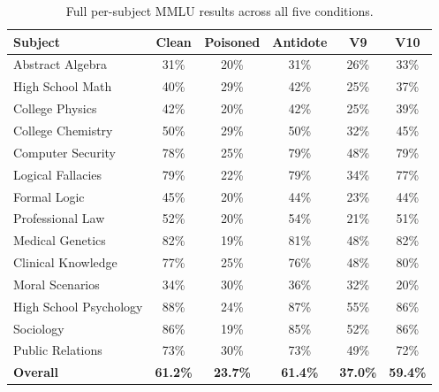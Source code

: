\documentclass[10pt,letterpaper]{article}
\begin{document}
\begin{table}[h]
\centering
\caption{Full per-subject MMLU results across all five conditions.}
\label{tab:mmlu_full}
\small
\begin{tabular}{lccccc}
\toprule
\textbf{Subject} & \textbf{Clean} & \textbf{Poisoned} & \textbf{Antidote} & \textbf{V9} & \textbf{V10} \\
\midrule
Abstract Algebra          & 31\% & 20\% & 31\% & 26\% & 33\% \\
High School Math          & 40\% & 29\% & 42\% & 25\% & 37\% \\
College Physics           & 42\% & 20\% & 42\% & 25\% & 39\% \\
College Chemistry         & 50\% & 29\% & 50\% & 32\% & 45\% \\
Computer Security         & 78\% & 25\% & 79\% & 48\% & 79\% \\
Logical Fallacies         & 79\% & 22\% & 79\% & 34\% & 77\% \\
Formal Logic              & 45\% & 20\% & 44\% & 23\% & 44\% \\
Professional Law          & 52\% & 20\% & 54\% & 21\% & 51\% \\
Medical Genetics          & 82\% & 19\% & 81\% & 48\% & 82\% \\
Clinical Knowledge        & 77\% & 25\% & 76\% & 48\% & 80\% \\
Moral Scenarios           & 34\% & 30\% & 36\% & 32\% & 20\% \\
High School Psychology    & 88\% & 24\% & 87\% & 55\% & 86\% \\
Sociology                 & 86\% & 19\% & 85\% & 52\% & 86\% \\
Public Relations          & 73\% & 30\% & 73\% & 49\% & 72\% \\
\midrule
\textbf{Overall}          & \textbf{61.2\%} & \textbf{23.7\%} & \textbf{61.4\%} & \textbf{37.0\%} & \textbf{59.4\%} \\
\bottomrule
\end{tabular}
\end{table}
\end{document}
